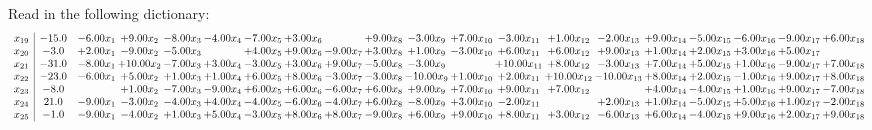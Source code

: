 \documentclass[9pt]{article}
\begin{document}
Read in the following dictionary:
\[\begin{array}{c| c c@{\hskip 2pt} c@{\hskip 2pt} c@{\hskip 2pt} c@{\hskip 2pt} c@{\hskip 2pt} c@{\hskip 2pt} c@{\hskip 2pt} c@{\hskip 2pt} c@{\hskip 2pt} c@{\hskip 2pt} c@{\hskip 2pt} c@{\hskip 2pt} c@{\hskip 2pt} c@{\hskip 2pt} c@{\hskip 2pt} c@{\hskip 2pt} c@{\hskip 2pt} c@{\hskip 2pt} }
 x_{19}   &  -15.0 & -6.00 x_{1} & +  9.00 x_{2} & -8.00 x_{3} & -4.00 x_{4} & -7.00 x_{5} & +  3.00 x_{6} &   & +  9.00 x_{8} & -3.00 x_{9} & +  7.00 x_{10} & -3.00 x_{11} & +  1.00 x_{12} & -2.00 x_{13} & +  9.00 x_{14} & -5.00 x_{15} & -6.00 x_{16} & -9.00 x_{17} & +  6.00 x_{18}\\
 x_{20}   &  -3.0 & +  2.00 x_{1} & -9.00 x_{2} & -5.00 x_{3} &   & +  4.00 x_{5} & +  9.00 x_{6} & -9.00 x_{7} & +  3.00 x_{8} & +  1.00 x_{9} & -3.00 x_{10} & +  6.00 x_{11} & +  6.00 x_{12} & +  9.00 x_{13} & +  1.00 x_{14} & +  2.00 x_{15} & +  3.00 x_{16} & +  5.00 x_{17} &   \\
 x_{21}   &  -31.0 & -8.00 x_{1} & + 10.00 x_{2} & -7.00 x_{3} & +  3.00 x_{4} & -3.00 x_{5} & +  3.00 x_{6} & +  9.00 x_{7} & -5.00 x_{8} & -3.00 x_{9} &   & + 10.00 x_{11} & +  8.00 x_{12} & -3.00 x_{13} & +  7.00 x_{14} & +  5.00 x_{15} & +  1.00 x_{16} & -9.00 x_{17} & +  7.00 x_{18}\\
 x_{22}   &  -23.0 & -6.00 x_{1} & +  5.00 x_{2} & +  1.00 x_{3} & +  1.00 x_{4} & +  6.00 x_{5} & +  8.00 x_{6} & -3.00 x_{7} & -3.00 x_{8} & -10.00 x_{9} & +  1.00 x_{10} & +  2.00 x_{11} & + 10.00 x_{12} & -10.00 x_{13} & +  8.00 x_{14} & +  2.00 x_{15} & -1.00 x_{16} & +  9.00 x_{17} & +  8.00 x_{18}\\
 x_{23}   &  -8.0  &   & +  1.00 x_{2} & -7.00 x_{3} & -9.00 x_{4} & +  6.00 x_{5} & +  6.00 x_{6} & -6.00 x_{7} & +  6.00 x_{8} & +  9.00 x_{9} & +  7.00 x_{10} & +  9.00 x_{11} & +  7.00 x_{12} &   & +  4.00 x_{14} & -4.00 x_{15} & +  1.00 x_{16} & +  9.00 x_{17} & -7.00 x_{18}\\
 x_{24}   &  21.0 & -9.00 x_{1} & -3.00 x_{2} & -4.00 x_{3} & +  4.00 x_{4} & -4.00 x_{5} & -6.00 x_{6} & -4.00 x_{7} & +  6.00 x_{8} & -8.00 x_{9} & +  3.00 x_{10} & -2.00 x_{11} &   & +  2.00 x_{13} & +  1.00 x_{14} & -5.00 x_{15} & +  5.00 x_{16} & +  1.00 x_{17} & -2.00 x_{18}\\
 x_{25}   &  -1.0 & -9.00 x_{1} & -4.00 x_{2} & +  1.00 x_{3} & +  5.00 x_{4} & -3.00 x_{5} & +  8.00 x_{6} & +  8.00 x_{7} & -9.00 x_{8} & +  6.00 x_{9} & +  9.00 x_{10} & +  8.00 x_{11} & +  3.00 x_{12} & -6.00 x_{13} & +  6.00 x_{14} & -4.00 x_{15} & +  9.00 x_{16} & +  2.00 x_{17} & +  9.00 x_{18}\\

\end{array}\]
\end{document}
